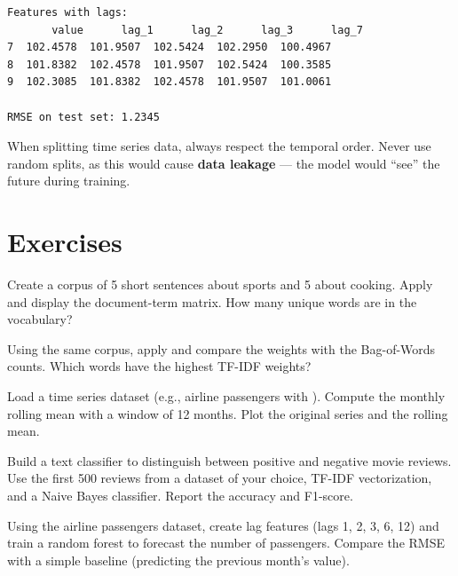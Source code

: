 \begin{codeoutput}
\begin{verbatim}
Features with lags:
       value      lag_1      lag_2      lag_3      lag_7
7  102.4578  101.9507  102.5424  102.2950  100.4967
8  101.8382  102.4578  101.9507  102.5424  100.3585
9  102.3085  101.8382  102.4578  101.9507  101.0061

RMSE on test set: 1.2345
\end{verbatim}
\end{codeoutput}

\begin{warning}
When splitting time series data, always respect the temporal order. Never use random splits, as this would cause \textbf{data leakage} --- the model would ``see'' the future during training.
\end{warning}

\section{Exercises}

\begin{exercise}[$\star$]
Create a corpus of 5 short sentences about sports and 5 about cooking. Apply  and display the document-term matrix. How many unique words are in the vocabulary?
\end{exercise}

\begin{exercise}[$\star$]
Using the same corpus, apply  and compare the weights with the Bag-of-Words counts. Which words have the highest TF-IDF weights?
\end{exercise}

\begin{exercise}[$\star\star$]
Load a time series dataset (e.g., airline passengers with ). Compute the monthly rolling mean with a window of 12 months. Plot the original series and the rolling mean.
\end{exercise}

\begin{exercise}[$\star\star$]
Build a text classifier to distinguish between positive and negative movie reviews. Use the first 500 reviews from a dataset of your choice, TF-IDF vectorization, and a Naive Bayes classifier. Report the accuracy and F1-score.
\end{exercise}

\begin{exercise}[$\star\star\star$]
Using the airline passengers dataset, create lag features (lags 1, 2, 3, 6, 12) and train a random forest to forecast the number of passengers. Compare the RMSE with a simple baseline (predicting the previous month's value).
\end{exercise}

